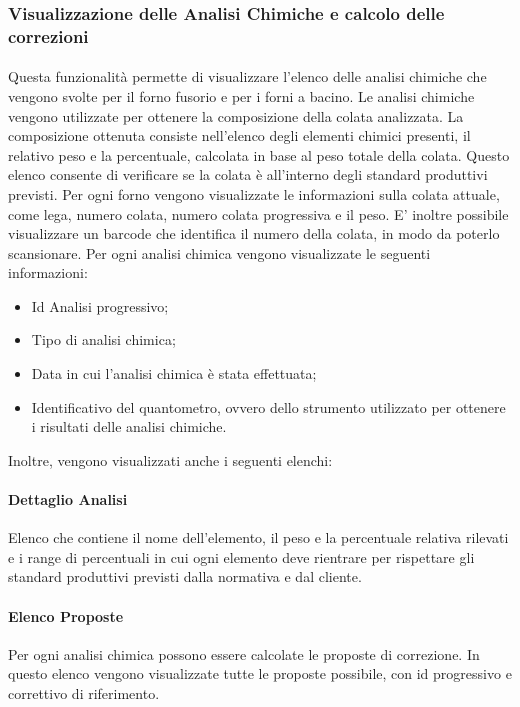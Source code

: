   \subsubsection{Visualizzazione delle Analisi Chimiche e calcolo delle correzioni}
  \paragraph{}
  Questa funzionalità permette di visualizzare l’elenco delle analisi chimiche che vengono svolte per 
  il forno fusorio e per i forni a bacino. Le analisi chimiche vengono utilizzate per ottenere la 
  composizione della colata analizzata. La composizione ottenuta consiste nell’elenco degli elementi 
  chimici presenti, il relativo peso e la percentuale, calcolata in base al peso totale della colata. 
  Questo elenco consente di verificare se la colata è all’interno degli standard produttivi previsti. 
  Per ogni forno vengono visualizzate le informazioni sulla colata attuale, come lega, numero colata, 
  numero colata progressiva e il peso. E’ inoltre possibile visualizzare un barcode che identifica il 
  numero della colata, in modo da poterlo scansionare. Per ogni analisi chimica vengono 
  visualizzate le seguenti informazioni: 
  \begin{itemize}
    \item Id Analisi progressivo;
    \item Tipo di analisi chimica;
    \item Data in cui l'analisi chimica è stata effettuata;
    \item Identificativo del quantometro, ovvero dello strumento utilizzato per ottenere i risultati 
    delle analisi chimiche.
  \end{itemize}   
  Inoltre, vengono visualizzati anche i seguenti elenchi:
  \paragraph{Dettaglio Analisi}
  Elenco che contiene il nome dell’elemento, il peso e la percentuale relativa rilevati e i range di 
  percentuali in cui ogni elemento deve rientrare per rispettare gli standard produttivi previsti dalla 
  normativa e dal cliente. 
  \paragraph{Elenco Proposte}
  Per ogni analisi chimica possono essere calcolate le proposte di correzione. In questo elenco vengono 
  visualizzate tutte le proposte possibile, con id progressivo e correttivo di riferimento.
